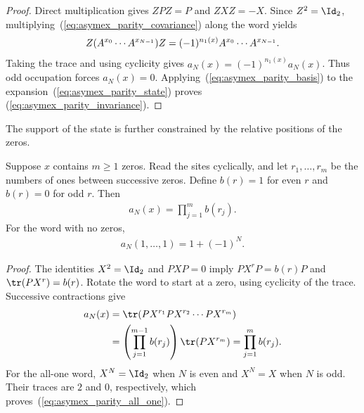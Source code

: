 \begin{proof}
    Direct multiplication gives $ZPZ=P$ and $ZXZ=-X$.
    Since $Z^2=\Id_2$, multiplying~(\ref{eq:asymex_parity_covariance})
    along the word yields
    \begin{align}
        Z(A^{x_0}\cdots A^{x_{N-1}})Z
        =(-1)^{n_1(x)}A^{x_0}\cdots A^{x_{N-1}}.
        \notag
    \end{align}
    Taking the trace and using cyclicity gives
    $a_N(x)=(-1)^{n_1(x)}a_N(x)$. Thus odd occupation forces
    $a_N(x)=0$. Applying~(\ref{eq:asymex_parity_basis}) to the
    expansion~(\ref{eq:asymex_parity_state}) proves
    (\ref{eq:asymex_parity_invariance}).
\end{proof}

The support of the state is further constrained by the relative positions of the
zeros.

\begin{lemma}
    \label{lem:asymex_parity_runs}
    Suppose $x$ contains $m\geq1$ zeros. Read the sites cyclically, and
    let $r_1,\ldots,r_m$ be the numbers of ones between successive
    zeros. Define $b(r)=1$ for even $r$ and $b(r)=0$ for odd $r$.
    Then
    \begin{align}
        a_N(x)=\prod_{j=1}^{m}b(r_j).
        \label{eq:asymex_parity_runs}
    \end{align}
    For the word with no zeros,
    \begin{align}
        a_N(1,\ldots,1)=1+(-1)^N.
        \label{eq:asymex_parity_all_one}
    \end{align}
\end{lemma}

\begin{proof}
    The identities $X^2=\Id_2$ and $PXP=0$ imply
    $PX^rP=b(r)P$ and $\tr(PX^r)=b(r)$. Rotate the word to
    start at a zero, using cyclicity of the trace. Successive
    contractions give
    \begin{align}
        a_N(x)
         & =\tr(PX^{r_1}PX^{r_2}\cdots PX^{r_m}) \notag       \\
         & =\left(\prod_{j=1}^{m-1}b(r_j)\right)\tr(PX^{r_m})
        =\prod_{j=1}^{m}b(r_j).
        \notag
    \end{align}
    For the all-one word, $X^N=\Id_2$ when $N$ is even and
    $X^N=X$ when $N$ is odd. Their traces are $2$ and $0$,
    respectively, which proves~(\ref{eq:asymex_parity_all_one}).
\end{proof}

